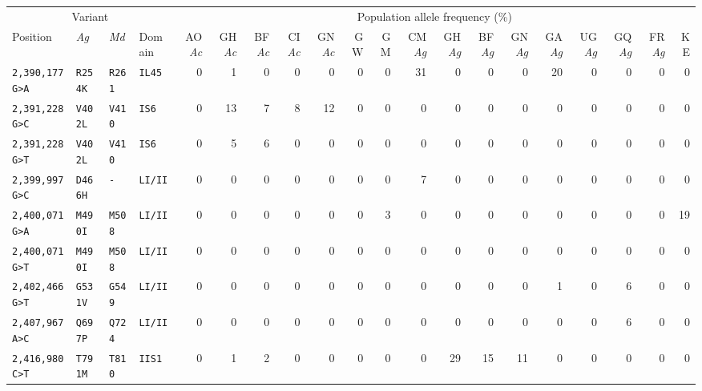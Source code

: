 
\begin{tabular}{llllrrrrrrrrrrrrrrrr}
\toprule
\multicolumn{4}{c}{Variant} &
\multicolumn{16}{c}{Population allele frequency (\%)}\\
\cmidrule(r){1-4}
\cmidrule(r){5-20}
Position\tnote{1} & 
\emph{Ag}\tnote{2} & 
\emph{Md}\tnote{3} &
Domain\tnote{4} &
AO\emph{Ac} &
GH\emph{Ac} &
BF\emph{Ac} &
CI\emph{Ac} &
GN\emph{Ac} &
GW &
GM &
CM\emph{Ag} &
GH\emph{Ag} &
BF\emph{Ag} & 
GN\emph{Ag} &  
GA\emph{Ag} & 
UG\emph{Ag} &
GQ\emph{Ag} &
FR\emph{Ag} & 
KE\\
\midrule

\texttt{2,390,177 G>A} & \texttt{R254K} & \texttt{R261} & \texttt{IL45} & 0 & 1 & 0 & 0 & 0 & 0 & 0 & 31 & 0 & 0 & 0 & 20 & 0 & 0 & 0 & 0 \\

\texttt{2,391,228 G>C} & \texttt{V402L} & \texttt{V410} & \texttt{IS6} & 0 & 13 & 7 & 8 & 12 & 0 & 0 & 0 & 0 & 0 & 0 & 0 & 0 & 0 & 0 & 0 \\

\texttt{2,391,228 G>T} & \texttt{V402L} & \texttt{V410} & \texttt{IS6} & 0 & 5 & 6 & 0 & 0 & 0 & 0 & 0 & 0 & 0 & 0 & 0 & 0 & 0 & 0 & 0 \\

\texttt{2,399,997 G>C} & \texttt{D466H} & \texttt{-} & \texttt{LI/II} & 0 & 0 & 0 & 0 & 0 & 0 & 0 & 7 & 0 & 0 & 0 & 0 & 0 & 0 & 0 & 0 \\

\texttt{2,400,071 G>A} & \texttt{M490I} & \texttt{M508} & \texttt{LI/II} & 0 & 0 & 0 & 0 & 0 & 0 & 3 & 0 & 0 & 0 & 0 & 0 & 0 & 0 & 0 & 19 \\

\texttt{2,400,071 G>T} & \texttt{M490I} & \texttt{M508} & \texttt{LI/II} & 0 & 0 & 0 & 0 & 0 & 0 & 0 & 0 & 0 & 0 & 0 & 0 & 0 & 0 & 0 & 0 \\

\texttt{2,402,466 G>T} & \texttt{G531V} & \texttt{G549} & \texttt{LI/II} & 0 & 0 & 0 & 0 & 0 & 0 & 0 & 0 & 0 & 0 & 0 & 1 & 0 & 6 & 0 & 0 \\

\texttt{2,407,967 A>C} & \texttt{Q697P} & \texttt{Q724} & \texttt{LI/II} & 0 & 0 & 0 & 0 & 0 & 0 & 0 & 0 & 0 & 0 & 0 & 0 & 0 & 6 & 0 & 0 \\

\texttt{2,416,980 C>T} & \texttt{T791M} & \texttt{T810} & \texttt{IIS1} & 0 & 1 & 2 & 0 & 0 & 0 & 0 & 0 & 29 & 15 & 11 & 0 & 0 & 0 & 0 & 0 \\


\end{tabular}
